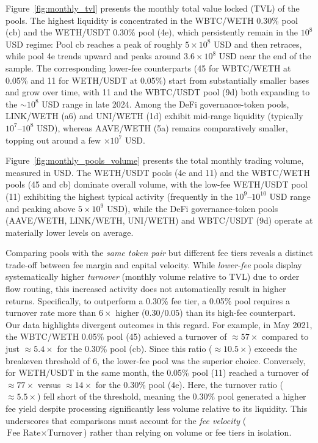 \documentclass[journal]{IEEEtran}
\begin{document}
Figure~\ref{fig:monthly_tvl} presents the monthly total value locked (TVL) of the pools. The highest liquidity is concentrated in the WBTC/WETH 0.30\% pool (cb) and the WETH/USDT 0.30\% pool (4e), which persistently remain in the $10^{8}$ USD regime: Pool cb reaches a peak of roughly $5\times10^{8}$ USD and then retraces, while pool 4e trends upward and peaks around $3.6\times10^{8}$ USD near the end of the sample. The corresponding lower-fee counterparts (45 for WBTC/WETH at 0.05\% and 11 for WETH/USDT at 0.05\%) start from substantially smaller bases and grow over time, with 11 and the WBTC/USDT pool (9d) both expanding to the $\sim10^{8}$ USD range in late 2024. Among the DeFi governance-token pools, LINK/WETH (a6) and UNI/WETH (1d) exhibit mid-range liquidity (typically $10^{7}$--$10^{8}$ USD), whereas AAVE/WETH (5a) remains comparatively smaller, topping out around a few $\times10^{7}$ USD. 

Figure~\ref{fig:monthly_pools_volume} presents the total monthly trading volume, measured in USD. The WETH/USDT pools (4e and 11) and the WBTC/WETH pools (45 and cb) dominate overall volume, with the low-fee WETH/USDT pool (11) exhibiting the highest typical activity (frequently in the $10^{9}$--$10^{10}$ USD range and peaking above $5\times10^{9}$ USD), while the DeFi governance-token pools (AAVE/WETH, LINK/WETH, UNI/WETH) and WBTC/USDT (9d) operate at materially lower levels on average. 

Comparing pools with the \emph{same token pair} but different fee tiers reveals a distinct trade-off between fee margin and capital velocity. While \emph{lower-fee} pools display systematically higher \emph{turnover} (monthly volume relative to TVL) due to order flow routing, this increased activity does not automatically result in higher returns. Specifically, to outperform a 0.30\% fee tier, a 0.05\% pool requires a turnover rate more than $6\times$ higher ($0.30/0.05$) than its high-fee counterpart.
Our data highlights divergent outcomes in this regard. For example, in May 2021, the WBTC/WETH 0.05\% pool (45) achieved a turnover of $\approx57\times$ compared to just $\approx5.4\times$ for the 0.30\% pool (cb). Since this ratio ($\approx 10.5\times$) exceeds the breakeven threshold of 6, the lower-fee pool was the superior choice. Conversely, for WETH/USDT in the same month, the 0.05\% pool (11) reached a turnover of $\approx77\times$ versus $\approx14\times$ for the 0.30\% pool (4e). Here, the turnover ratio ($\approx 5.5\times$) fell short of the threshold, meaning the 0.30\% pool generated a higher fee yield despite processing significantly less volume relative to its liquidity. This underscores that comparisons must account for the \emph{fee velocity} ($\text{Fee Rate} \times \text{Turnover}$) rather than relying on volume or fee tiers in isolation.
\end{document}
